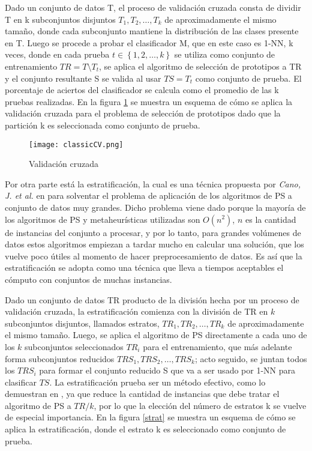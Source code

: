 Dado un conjunto de datos T, el proceso de validación cruzada \cite{kohavi1995study} consta de dividir T en k subconjuntos disjuntos $T_1,T_2,\dots,T_k$ de aproximadamente el mismo tamaño, donde cada subconjunto mantiene la distribución de las clases presente en T. Luego se procede a probar el clasificador M, que en este caso es 1-NN, k veces, donde en cada prueba $t \in \left\{1,2,\dots,k\right\}$ se utiliza como conjunto de entrenamiento $TR=T \setminus T_t$, se aplica el algoritmo de selección de prototipos a TR y el conjunto resultante S se valida al usar $TS=T_t$ como conjunto de prueba. El porcentaje de aciertos del clasificador se calcula como el promedio de las k pruebas realizadas.  En la figura \ref{crossval} se muestra un esquema de cómo se aplica la validación cruzada para el problema de selección de prototipos dado que la partición k es seleccionada como conjunto de prueba.

\begin{figure}[]
\centering
\texttt{[image: classicCV.png]}
\caption[Validación cruzada]{Validación cruzada}
\label{crossval}
\end{figure}

Por otra parte está la estratificación, la cual es una técnica propuesta por \emph{Cano, J. et al.} en \cite{cano2005stratification} para solventar el problema de aplicación de los algoritmos de PS a conjunto de datos muy grandes. Dicho problema viene dado porque la mayoría de los algoritmos de PS y metaheurísticas utilizadas son $O(n^2)$, $n$ es la cantidad de instancias del conjunto a procesar, y por lo tanto, para grandes volúmenes de datos estos algoritmos empiezan a tardar mucho en calcular una solución, que los vuelve poco útiles al momento de hacer preprocesamiento de datos. Es así que la estratificación se adopta como una técnica que lleva a tiempos aceptables el cómputo con conjuntos de muchas instancias. 

Dado un conjunto de datos TR producto de la división hecha por un proceso de validación cruzada, la estratificación comienza con la división de TR en $k$ subconjuntos disjuntos, llamados estratos, $TR_1,TR_2,\dots,TR_k$ de aproximadamente el mismo tamaño. Luego, se aplica el algoritmo de PS directamente a cada uno de los $k$ subconjuntos seleccionados $TR_i$ para el entrenamiento, que más adelante forma subconjuntos reducidos $TRS_1,TRS_2,\dots,TRS_k$; acto seguido, se juntan todos los $TRS_i$ para formar el conjunto reducido S que va a ser usado por 1-NN para clasificar $TS$. La estratificación prueba ser un método efectivo, como lo demuestran en \cite{cano2005stratification}, ya que reduce la cantidad de instancias que debe tratar el algoritmo de PS a $TR/k$, por lo que la elección del número de estratos k se vuelve de especial importancia. En la figura \ref{strat} se muestra un esquema de cómo se aplica la estratificación, donde el estrato k es seleccionado como conjunto de prueba.

